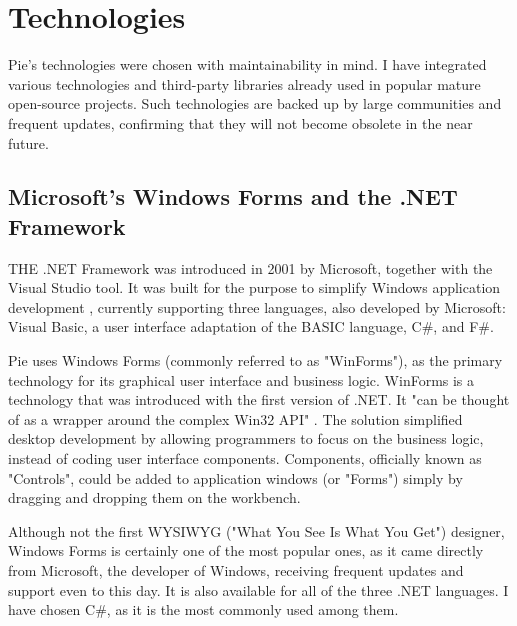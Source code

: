 \chapter{Technologies}
\thispagestyle{pagestyle}

Pie's technologies were chosen with maintainability in mind. I have integrated various technologies and third-party libraries already used in popular mature open-source projects. Such technologies are backed up by large communities and frequent updates, confirming that they will not become obsolete in the near future.

\section{Microsoft's Windows Forms and the .NET Framework}

THE .NET Framework was introduced in 2001 by Microsoft, together with the Visual Studio tool. It was built for the purpose to simplify Windows application development \cite{net-framework}, currently supporting three languages, also developed by Microsoft: Visual Basic, a user interface adaptation of the BASIC language, C\#, and F\#.

Pie uses Windows Forms (commonly referred to as "WinForms"), as the primary technology for its graphical user interface and business logic. WinForms is a technology that was introduced with the first version of .NET. It "can be thought of as a wrapper around the complex Win32 API" \cite{winforms-history}. The solution 
simplified desktop development by allowing programmers to focus on the business logic, instead of coding user interface components. Components, officially known as "Controls", could be added to application windows (or "Forms") simply by dragging and dropping them on the workbench.

Although not the first WYSIWYG ("What You See Is What You Get") designer, Windows Forms is certainly one of the most popular ones, as it came directly from Microsoft, the developer of Windows, receiving frequent updates and support even to this day. It is also available for all of the three .NET languages. I have chosen C\#, as it is the most commonly used among them.

